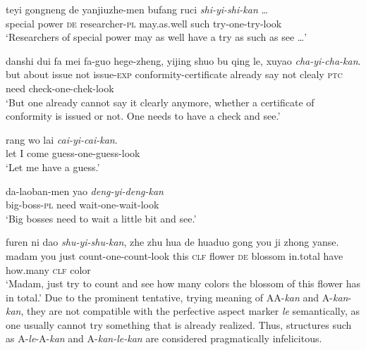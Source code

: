 \begin{sloppypar}
\ea\label{ex:AyiAkan}
\ea
\gll teyi gongneng de yanjiuzhe-men bufang ruci \textit{shi-yi-shi-kan} \ldots\\
special power \textsc{de} researcher-\textsc{pl} may.as.well such try-one-try-look\\ 
\glt `Researchers of special power may as well have a try as such as see \ldots'

\ex 
\gll danshi dui fa mei fa-guo hege-zheng, yijing shuo bu qing le, xuyao \textit{cha-yi-cha-kan}.\\
but about issue not issue-\textsc{exp} conformity-certificate already say not clealy \textsc{ptc} need check-one-chek-look\\ 
\glt `But one already cannot say it clearly anymore, whether a certificate of conformity is issued or not. One needs to have a check and see.'

\ex
\gll rang wo lai \textit{cai-yi-cai-kan}.\\
let I come guess-one-guess-look\\ 
\glt `Let me have a guess.'

\ex
\gll da-laoban-men yao \textit{deng-yi-deng-kan}\\
big-boss-\textsc{pl} need wait-one-wait-look\\ 
\glt `Big bosses need to wait a little bit and see.'

\ex
\gll furen ni dao \textit{shu-yi-shu-kan}, zhe zhu hua de huaduo gong you ji zhong yanse.\\
madam you just count-one-count-look this \textsc{clf} flower \textsc{de} blossom in.total have how.many \textsc{clf} color\\ 
\glt `Madam, just try to count and see how many colors the blossom of this flower has in total.'
\z
\z
Due to the prominent tentative, trying meaning of AA-\textit{kan} and A-\textit{kan}-\textit{kan}, they are not compatible with the perfective aspect marker \textit{le} semantically,
as one usually cannot try something that is already realized.
Thus, structures such as  A\hyp{}\textit{le}\hyp{}A\hyp{}\textit{kan} and A\hyp{}\textit{kan\hyp{}le\hyp{}kan} are considered pragmatically infelicitous.
\end{sloppypar}

